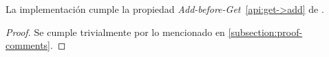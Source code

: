 \begin{lemma}
  La implementación \hashchain cumple la propiedad \textit{Add-before-Get}~\ref{api:get->add} de \setchain.
\end{lemma}

\begin{proof}
  Se cumple trivialmente por lo mencionado en \ref{subsection:proof-comments}.
\end{proof}






